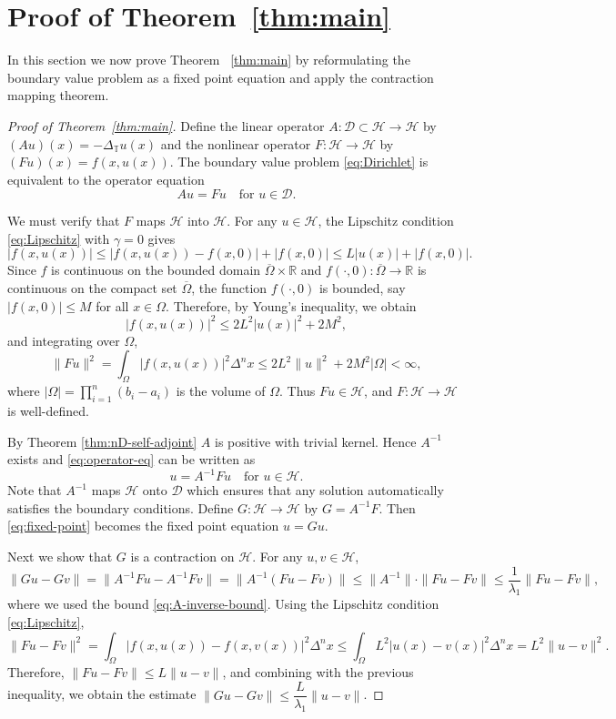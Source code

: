 \documentclass{article}
\numberwithin{equation}{section}
\numberwithin{theorem}{section}
\begin{document}
\section{Proof of Theorem~\ref{thm:main}}\label{sec:main}
In this section we now prove Theorem~ \ref{thm:main} by reformulating the boundary value problem as a fixed point equation and apply the contraction mapping theorem.
\begin{proof}[Proof of Theorem~\ref{thm:main}]
Define the linear operator $A\colon \mathscr{D} \subset \mathscr{H} \to \mathscr{H}$ by $(Au)(x) = -\Delta_{\mathbb{T}} u(x)$ and the nonlinear operator $F\colon \mathscr{H} \to \mathscr{H}$ by $(Fu)(x) = f(x, u(x))$. The boundary value problem \eqref{eq:Dirichlet} is equivalent to the operator equation
\begin{equation}\label{eq:operator-eq}
Au = Fu \quad \text{for } u \in \mathscr{D}.
\end{equation}

We must verify that $F$ maps $\mathscr{H}$ into $\mathscr{H}$. For any $u \in \mathscr{H}$, the Lipschitz condition \eqref{eq:Lipschitz} with $\gamma = 0$ gives
\[
|f(x, u(x))| \leq |f(x, u(x)) - f(x, 0)| + |f(x, 0)| \leq L|u(x)| + |f(x, 0)|.
\]
Since $f$ is continuous on the bounded domain $\overline{\Omega} \times \mathbb{R}$ and $f(\cdot, 0)\colon \overline{\Omega} \to \mathbb{R}$ is continuous on the compact set $\overline{\Omega}$, the function $f(\cdot, 0)$ is bounded, say $|f(x, 0)| \leq M$ for all $x \in \Omega$. Therefore, by Young's inequality, we obtain
\[
|f(x, u(x))|^2 \leq 2L^2|u(x)|^2 + 2M^2,
\]
and integrating over $\Omega$,
\[
\|Fu\|^2 = \int_{\Omega} |f(x, u(x))|^2 \Delta^n x \leq 2L^2 \|u\|^2 + 2M^2 |\Omega| < \infty,
\]
where $|\Omega| = \displaystyle\prod_{i=1}^{n}(b_i - a_i)$ is the volume of $\Omega$. Thus $Fu \in \mathscr{H}$, and $F\colon \mathscr{H} \to \mathscr{H}$ is well-defined.

By Theorem \ref{thm:nD-self-adjoint} $A$ is positive with trivial kernel. Hence $A^{-1}$ exists and \eqref{eq:operator-eq} can be written as
\begin{equation}\label{eq:fixed-point}
u = A^{-1}Fu \quad \text{for } u \in \mathscr{H}.
\end{equation}
Note that $A^{-1}$ maps $\mathscr{H}$ onto $\mathscr{D}$ which ensures that any solution automatically satisfies the boundary conditions.
Define $G \colon \mathscr{H} \to \mathscr{H}$ by $G = A^{-1}F$. Then \eqref{eq:fixed-point} becomes the fixed point equation $u = Gu$.

Next we show that $G$ is a contraction on $\mathscr{H}$. For any $u, v \in \mathscr{H}$,
\[\|Gu - Gv\| = \|A^{-1}Fu - A^{-1}Fv\| = \|A^{-1}(Fu - Fv)\| \leq \|A^{-1}\| \cdot \|Fu - Fv\| \leq \frac{1}{\lambda_1} \|Fu - Fv\|,\]
where we used the bound \eqref{eq:A-inverse-bound}.
Using the Lipschitz condition \eqref{eq:Lipschitz},
\[\|Fu - Fv\|^2 = \int_{\Omega} |f(x, u(x)) - f(x, v(x))|^2 \Delta^n x\leq \int_{\Omega} L^2 |u(x) - v(x)|^2 \Delta^n x= L^2 \|u - v\|^2.\]
Therefore, $\|Fu - Fv\| \leq L \|u - v\|$, and combining with the previous inequality, we obtain the estimate 
$\|Gu - Gv\| \leq \dfrac{L}{\lambda_1} \|u - v\|$.


\end{proof}
\end{document}

